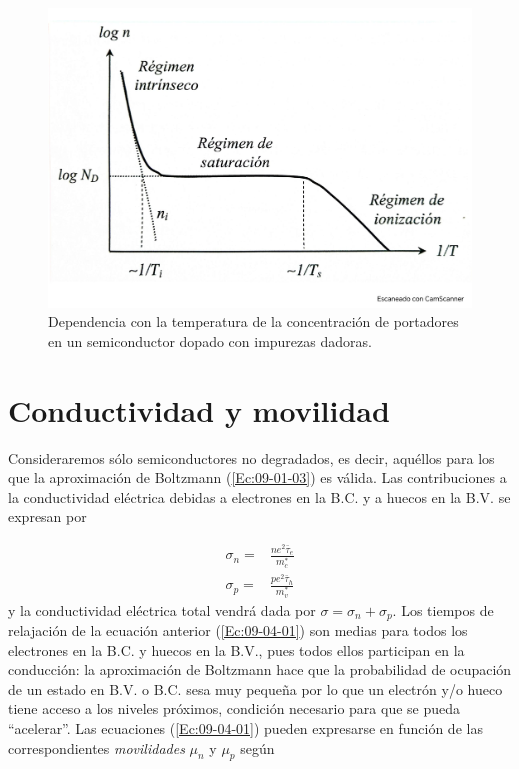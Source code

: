 \begin{figure}[h!] \centering
	\includegraphics[scale=0.35]{Cuerpo/Ch_09/Fotos libro 4.pdf}
	\caption{Dependencia con la temperatura de la concentración de portadores en un semiconductor dopado con impurezas dadoras.}
	\label{Fig:09-04}
\end{figure}

\section{Conductividad y movilidad}

Consideraremos sólo semiconductores no degradados, es decir, aquéllos para los que la aproximación de Boltzmann (\ref{Ec:09-01-03}) es válida. Las contribuciones a la conductividad eléctrica debidas a electrones en la B.C. y a huecos en la B.V. se expresan por 

\begin{equation}
\begin{split}
	\sigma_n = & \frac{ne^2 \bar{\tau}_e}{m_c^*} \\	
	\sigma_p = & \frac{pe^2 \bar{\tau}_h}{m_v^*}
\end{split} \label{Ec:09-04-01}
\end{equation}
y la conductividad eléctrica total vendrá dada por $\sigma=\sigma_n + \sigma_p$. Los tiempos de relajación de la ecuación anterior (\ref{Ec:09-04-01}) son medias para todos los electrones en la B.C. y huecos en la B.V., pues todos ellos participan en la conducción: la aproximación de Boltzmann hace que la probabilidad de ocupación de un estado en B.V. o B.C. sesa muy pequeña por lo que un electrón y/o hueco tiene acceso a los niveles próximos, condición necesario para que se pueda ``acelerar''. Las ecuaciones (\ref{Ec:09-04-01}) pueden expresarse en función de las correspondientes \textit{movilidades} $\mu_n$ y $\mu_p$ según


